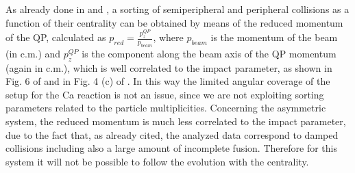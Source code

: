 \documentclass[twocolumn,showpacs,superscriptaddress,aps,prc,10pt,nofootinbib]{revtex4-1}
\begin{document}
As already done in \cite{Camaiani2021} and \cite{Ciampi2022}, a sorting of semiperipheral and peripheral collisions as a function of their centrality can be obtained by means of the reduced momentum of the QP, calculated as \(p_{red}=\frac{p_z^{QP}}{p_{beam}}\), where $p_{beam}$ is the momentum of the beam (in c.m.) and $p_z^{QP}$ is the component along the beam axis of the QP momentum (again in c.m.), which is well correlated to the impact parameter, as shown in Fig. 6 of \cite{Ciampi2022} and in Fig. 4 (c) of \cite{Camaiani2021}. In this way the limited angular coverage of the setup for the Ca reaction is not an issue, since we are not exploiting sorting parameters related to the particle multiplicities. Concerning the asymmetric system, the reduced momentum is much less correlated to the impact parameter, due to the fact that, as already cited, the analyzed data correspond to damped collisions including also a large amount of incomplete fusion. Therefore for this system it will not be possible to follow the evolution with the centrality.
  



\end{document}

